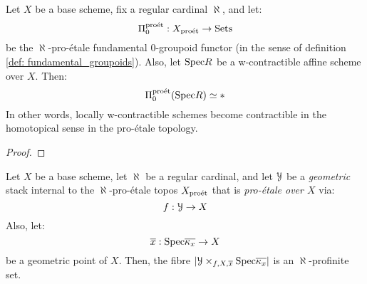                     \begin{lemma} \label{lemma: pro_etale_locally_contractible}
                        Let $X$ be a base scheme, fix a regular cardinal $\aleph$, and let:
                            $$\Pi_0^{\mathrm{pro\acute{e}t}}: X_{\mathrm{pro\acute{e}t}} \to \mathrm{Sets}$$
                        be the $\aleph$-pro-\'etale fundamental $0$-groupoid functor (in the sense of definition \ref{def: fundamental_groupoids}). Also, let $\mathrm{Spec} R$ be a w-contractible affine scheme over $X$. Then:
                            $$\Pi_0^{\mathrm{pro\acute{e}t}}(\mathrm{Spec} R) \simeq *$$
                        In other words, locally w-contractible schemes become contractible in the homotopical sense in the pro-\'etale topology. 
                    \end{lemma}
                        \begin{proof}
                            
                        \end{proof}
                    \begin{corollary} \label{coro: pro_etale_fibres}
                        Let $X$ be a base scheme, let $\aleph$ be a regular cardinal, and let $\mathcal{Y}$ be a \textit{geometric} stack internal to the $\aleph$-pro-\'etale topos $X_{\mathrm{pro\acute{e}t}}$ that is \textit{pro-\'etale over $X$} via:
                            $$f: \mathcal{Y} \to X$$
                        Also, let:
                            $$\overline{x}: \mathrm{Spec} \overline{\kappa_x} \to X$$
                        be a geometric point of $X$. Then, the fibre $|\calY \x_{f, X, \overline{x}} \Spec \overline{\kappa_x}|$ is an $\aleph$-profinite set.
                    \end{corollary}
                    
